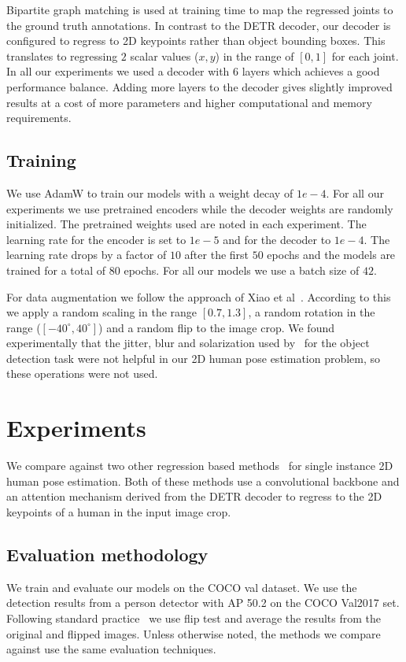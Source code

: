 \documentclass[runningheads]{llncs}
\begin{document}
Bipartite graph matching is used at training time  to map the regressed joints to the 
ground truth annotations. In contrast to the DETR decoder, our decoder is 
configured to regress to 2D keypoints rather than object bounding boxes. 
This translates to regressing $2$ scalar values ($x,y$) in the range of $[0,1]$ for each joint. In all our experiments we used a decoder with $6$ layers which achieves a good performance balance. Adding more layers to the decoder gives slightly improved results at a cost of more parameters and higher computational and memory requirements. 


\subsection{Training}
\label{sec:training}
We use AdamW to train our models with a weight decay of $1e-4$. For all our experiments we use pretrained encoders while the decoder weights are randomly initialized. The pretrained weights used are noted in each experiment. The learning rate for the encoder is set to $1e-5$ and for the decoder to $1e-4$. The learning rate drops by a factor of $10$ after the first $50$ epochs and 
the models are trained for a total of $80$ epochs. For all our models we use a 
batch size of $42$.

For data augmentation we follow the approach of Xiao et al~\cite{xiao2018simple}. According to this we apply a random scaling in the range $[0.7, 1.3]$, a random rotation in the range ($[-40^\circ, 40^\circ]$) and a random flip to the image crop. We  found experimentally that the jitter, blur and solarization used by~\cite{carion2020end} for the object detection task were not helpful in our 2D human pose estimation problem, so these operations were not used.

\section{Experiments}
\label{sec:experiments}
We compare against two other regression based methods~\cite{li2021pose,mao2021tfpose} for 
single instance 2D human pose estimation. Both of these methods use a convolutional backbone 
and an attention mechanism derived from the DETR decoder to regress to the 
2D keypoints of a human in the input image crop.

\subsection{Evaluation methodology}
We train and evaluate our models on the COCO val dataset. We use the detection results from a person detector with AP 50.2 on the COCO Val2017 set. Following standard practice~\cite{xiao2018simple,li2021pose} we use flip test and average the results from the original and flipped images. Unless otherwise noted, the methods we compare against use the same evaluation techniques.
\end{document}
